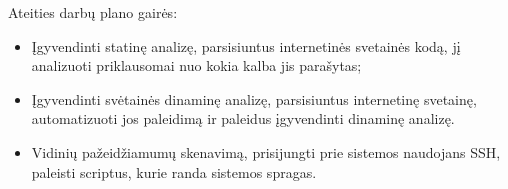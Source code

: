 \documentclass[a4paper,12pt,fleqn]{article}
\begin{document}



Ateities darbų plano gairės:

\begin{itemize}
	\item Įgyvendinti statinę analizę, parsisiuntus internetinės svetainės kodą, jį analizuoti priklausomai nuo kokia kalba jis parašytas;
	\item Įgyvendinti svėtainės dinaminę analizę, parsisiuntus internetinę svetainę, automatizuoti jos paleidimą ir paleidus įgyvendinti dinaminę analizę.
	\item Vidinių pažeidžiamumų skenavimą, prisijungti prie sistemos naudojans SSH, paleisti scriptus, kurie randa sistemos spragas.
\end{itemize}


%



\end{document}
